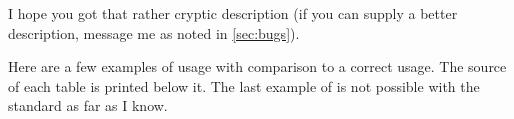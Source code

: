 I hope you got that rather cryptic description (if you can supply a better
description, message me as noted in \autoref{sec:bugs}).

Here are a few examples of usage with comparison to a correct  usage.
The source of each table is printed below it. The last example of 
is not possible with the standard  as far as I know.
\begin{multicols}{2}%
  \noindent
\vbox{}
\vbox{}
\vbox{}
\vbox{}
\vbox{}
\end{multicols}%

